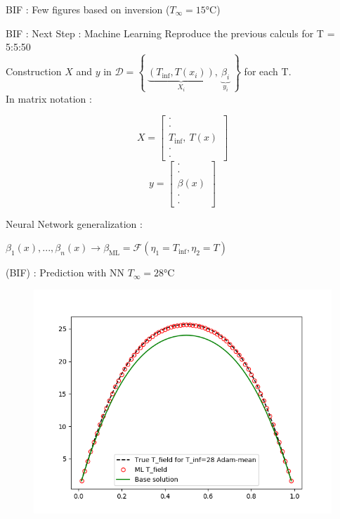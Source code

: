 \documentclass[10pt,
			   xcolor=svgnames,
			   hyperref={linkcolor=red, citecolor = DarkGreen, colorlinks=true, urlcolor=Navy}]{beamer}
\newcommand{\bepar}[1]{
	\left( #1 \right)  
}
\begin{document}
\begin{frame}{BIF : Few figures based on inversion ($T_\infty = \ang{15}$C)}
\begin{multicols}{2}
	
\end{multicols}
\end{frame}

\begin{frame}{BIF : Next Step : Machine Learning}
Reproduce the previous calculs for T = 5:5:50 \\[1cm]

Construction $X$ and $y$ in $\mathcal{D} = \left\lbrace \ \underbrace{\bepar{T_{\text{inf}},T(x_i)}}_{X_i}, \ \underbrace{\beta_i}_{y_i}\ \right\rbrace$ for each T.\\
In matrix notation : 

\begin{multicols}{2}
\noindent
$$ X = \left[ \begin{array}{c} \cdot \\ \cdot \\ T_{\text{inf}},\ T(x) \\ \cdot \\ \cdot
			  \end{array}
	   \right]
$$
\columnbreak
$$ y = \left[ \begin{array}{c} \cdot \\ \cdot \\ \beta(x) \\ \cdot \\ \cdot
			  \end{array}
	   \right]
$$
\end{multicols}
Neural Network generalization : \\
\begin{center}
 $\beta_1(x), ..., \beta_n(x) \rightarrow \beta_{\text{ML}} = \mathcal{F}\bepar{\eta_1 = T_{\text{inf}}, \eta_2= T}$
\end{center}
\end{frame}

\begin{frame}{(BIF) : Prediction with NN }
$T_\infty = \ang{28}$C 
\begin{figure}[H]
	\centering
	\includegraphics[scale=0.5]{T_True_vs_T_ML_N_sample_5_T_inf_28_Adam-mean.png}
\end{figure}

\end{frame}
\end{document}
